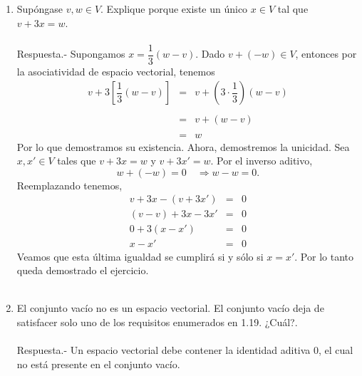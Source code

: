 \begin{enumerate}[\bfseries 1.]
    \item Supóngase $v,w\in V$. Explique porque existe un único $x\in V$ tal que $v+3x=w$.\\\\
	Respuesta.-\; Supongamos $x=\dfrac{1}{3}(w-v)$. Dado $v+(-w)\in V$, entonces  por la asociatividad de espacio vectorial, tenemos
	$$\begin{array}{rcl}
	    v+3\left[\dfrac{1}{3}(w-v)\right] &=& v + \left(3\cdot\dfrac{1}{3}\right)(w-v)\\\\
	    &=& v+(w-v)\\\\
	    &=& w
	\end{array}$$
	Por lo que demostramos su existencia. Ahora, demostremos la unicidad. Sea $x,x'\in V$ tales que $v+3x=w$ y $v+3x'=w$. Por el inverso aditivo, 
	$$w+(-w)=0 \quad \Rightarrow w-w=0.$$
	Reemplazando tenemos,
	$$\begin{array}{rcl}
	    v+3x-(v+3x') &=&0\\
	    (v-v) + 3x-3x' &=&0\\
	    0+3(x-x')&=&0\\
	    x-x'&=&0
	\end{array}$$
	Veamos que esta última igualdad se cumplirá si y sólo si $x=x'$. Por lo tanto queda demostrado el ejercicio.\\\\


    \item El conjunto vacío no es un espacio vectorial. El conjunto vacío deja de satisfacer solo uno de los requisitos enumerados en 1.19. ¿Cuál?.\\\\
	Respuesta.-\; Un espacio vectorial debe contener la identidad aditiva $0$, el cual no está presente en el conjunto vacío.\\\\


\end{enumerate}
